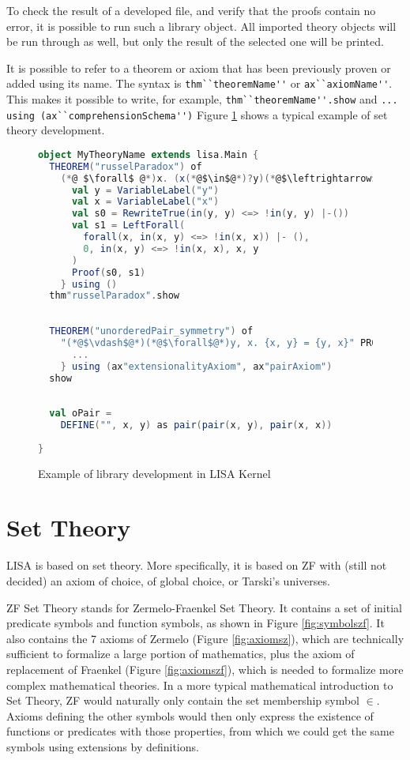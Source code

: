 To check the result of a developed file, and verify that the proofs contain no error, it is possible to run such a library object.
All imported theory objects will be run through as well, but only the result of the selected one will be printed.

It is possible to refer to a theorem or axiom that has been previously proven or added using its name. The syntax is \lstinline{thm``theoremName''}{} or \lstinline{ax``axiomName''}{}. This makes it possible to write, for example, \lstinline{thm``theoremName''.show}{} and \lstinline{... using (ax``comprehensionSchema'')} Figure \ref{fig:kernellibrary} shows a typical example of set theory development.


\begin{figure}[hp]
  \begin{lstlisting}[language=Scala, frame=single]
object MyTheoryName extends lisa.Main {
  THEOREM("russelParadox") of 
    (*@ $\forall$ @*)x. (x(*@$\in$@*)?y)(*@$\leftrightarrow$@*) (*@$\neg$@*)(x(*@$\in$@*)x)(*@$\vdash$@*) PROOF {
      val y = VariableLabel("y")
      val x = VariableLabel("x")
      val s0 = RewriteTrue(in(y, y) <=> !in(y, y) |-())
      val s1 = LeftForall(
        forall(x, in(x, y) <=> !in(x, x)) |- (),
        0, in(x, y) <=> !in(x, x), x, y
      )
      Proof(s0, s1)
    } using ()
  thm"russelParadox".show
  
  
  THEOREM("unorderedPair_symmetry") of
    "(*@$\vdash$@*)(*@$\forall$@*)y, x. {x, y} = {y, x}" PROOF {
      ...
    } using (ax"extensionalityAxiom", ax"pairAxiom")
  show
  
  
  val oPair = 
    DEFINE("", x, y) as pair(pair(x, y), pair(x, x))
  
}
\end{lstlisting}
  \caption{Example of library development in LISA Kernel}
  \label{fig:kernellibrary}
\end{figure}





\chapter{Set Theory}
\label{chapt:settheory}
LISA is based on set theory. More specifically, it is based on ZF with (still not decided) an axiom of choice, of global choice, or Tarski's universes.

ZF Set Theory stands for Zermelo-Fraenkel Set Theory. It contains a set of initial predicate symbols and function symbols, as shown in Figure \ref{fig:symbolszf}. It also contains the 7 axioms of Zermelo (Figure \ref{fig:axiomsz}), which are technically sufficient to formalize a large portion of mathematics, plus the axiom of replacement of Fraenkel (Figure \ref{fig:axiomszf}), which is needed to formalize more complex mathematical theories.
In a more typical mathematical introduction to Set Theory, ZF would naturally only contain the set membership symbol $\in$. Axioms defining the other symbols would then only express the existence of functions or predicates with those properties, from which we could get the same symbols using extensions by definitions.


